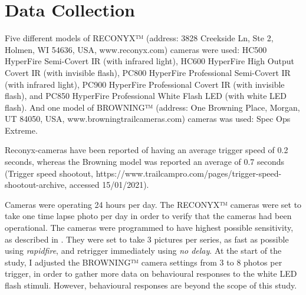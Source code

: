 \section{Data Collection} %
Five different models of RECONYX™ (address: 3828 Creekside Ln, Ste 2, Holmen, WI 54636, USA, www.reconyx.com) cameras were used: HC500 HyperFire Semi-Covert IR (with infrared light), HC600 HyperFire High Output Covert IR (with invisible flash), PC800 HyperFire Professional Semi-Covert IR (with infrared light), PC900 HyperFire Professional Covert IR (with invisible flash), and PC850 HyperFire Professional White Flash LED (with white LED flash). %
And one model of BROWNING™ (address: One Browning Place, Morgan, UT 84050, USA, www.browningtrailcameras.com) cameras was used: Spec Ops Extreme.


Reconyx-cameras have been reported of having an average trigger speed of 0.2 seconds, whereas the Browning model was reported an average of 0.7 seconds (Trigger speed shootout, https://www.trailcampro.com/pages/trigger-speed-shootout-archive, accessed 15/01/2021).



Cameras were operating 24 hours per day. The RECONYX™ cameras were set to take one time lapse photo per day in order to verify that the cameras had been operational.
The cameras were programmed to have highest possible sensitivity, as described in \cite{Odden2015}. %
 They were set to take 3 pictures per series, as fast as possible using \emph{rapidfire}, and retrigger immediately using \emph{no delay}.
At the start of the study, I adjusted the BROWNING™ camera settings from 3 to 8 photos per trigger, in order to gather more data on behavioural responses to the white LED flash stimuli. 
However, behavioural responses are beyond the scope of this study. %


